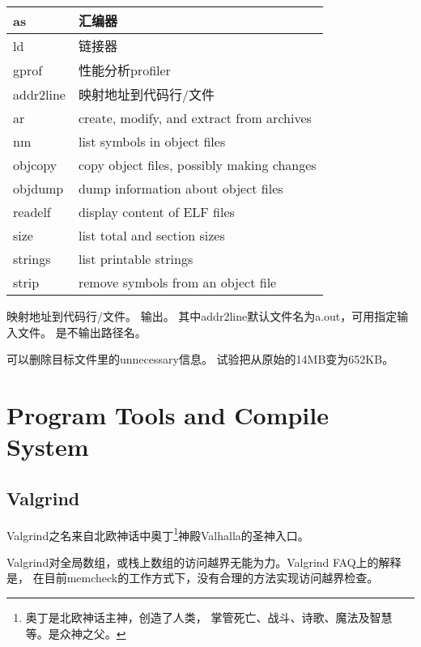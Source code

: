 \begin{tabular}{|l|l|}\hline
as          & 汇编器\\\hline
ld          & 链接器\\\hline
gprof       & 性能分析profiler \\\hline
addr2line   & 映射地址到代码行/文件 \\\hline
ar          & create, modify, and extract from archives\\\hline
nm          & list symbols in object files\\\hline
objcopy     & copy object files, possibly making changes\\\hline
objdump     & dump information about object files\\\hline
readelf     & display content of ELF files\\\hline
size        & list total and section sizes\\\hline
strings     & list printable strings\\\hline
strip       & remove symbols from an object file\\\hline
\end{tabular}

映射地址到代码行/文件。
输出。
其中addr2line默认文件名为a.out，可用指定输入文件。
是不输出路径名。

可以删除目标文件里的unnecessary信息。
试验把从原始的14MB变为652KB。

\chapter{Program Tools and Compile System}

\section{Valgrind}
Valgrind之名来自北欧神话中奥丁\footnote{奥丁是北欧神话主神，创造了人类，
掌管死亡、战斗、诗歌、魔法及智慧等。是众神之父。}神殿Valhalla的圣神入口。

Valgrind对全局数组，或栈上数组的访问越界无能为力。Valgrind FAQ上的解释是，
在目前memcheck的工作方式下，没有合理的方法实现访问越界检查。

